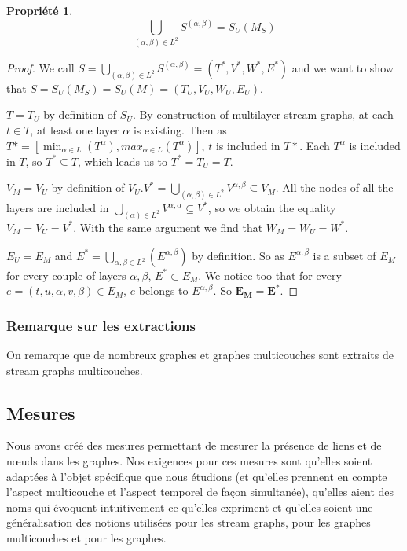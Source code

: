 \documentclass[11pt,a4paper]{article}
\newtheorem{prop}{Propriété}
\theoremstyle{definition}
\theoremstyle{remark}
\theoremstyle{remark}
\begin{document}
	\begin{prop}
		\[
			\bigcup_{(\alpha,\beta) \in L^2} S^{(\alpha,\beta)} = S_U(M_S)
		\]
	\end{prop}
	\begin{proof}
	We call $S=\bigcup_{(\alpha,\beta) \in L^2} S^{(\alpha,\beta)}=(T^{*},V^{*},W^{*},E^{*})$ and we want to show that $S=S_U(M_S)=S_U(M) = (T_U,V_U,W_U,E_U)$.
	
	$T=T_U$ by definition of $S_U$. By construction of multilayer stream graphs, at each $t\in T$, at least one layer $\alpha$ is existing. Then as $T* = [\min_{\alpha \in L} (T^{\alpha}),max_{\alpha \in L} (T^{\alpha})]$, $t$ is included in $T*$. Each $T^{\alpha}$ is included in $T$, so $T^* \subseteq T$, which leads us to $T^*=T_U=T$.
	
	$V_M = V_U$ by definition of $V_U$.$V^{*}=\bigcup_{(\alpha,\beta) \in L^2} V^{\alpha,\beta} \subseteq V_M$. All the nodes of all the layers are included in $\bigcup_{(\alpha) \in L^2} V^{\alpha,\alpha} \subseteq V^{*}$, so we obtain the equality $V_M=V_U=V^*$.
	With the same argument we find that $W_M=W_U=W^*$.
	
	$E_U=E_M$ and $E^{*}=\bigcup_{\alpha,\beta \in L^2}(E^{\alpha,\beta})$ by definition. So as $E^{\alpha,\beta}$ is a subset of $E_M$ for every couple of layers $\alpha,\beta$, $E^{*} \subset E_M$. We notice too that for every $e =(t,u,\alpha,v,\beta) \in E_M$, $e$ belongs to $E^{\alpha,\beta}$. So $\mathbf{E_M=E^{*}}$.
					
	\end{proof}

\subsubsection{Remarque sur les extractions}
On remarque que de nombreux graphes et graphes multicouches sont extraits de stream graphs multicouches.


\subsection{Mesures}


Nous avons créé des mesures permettant de mesurer la présence de liens et de nœuds dans les graphes. Nos exigences pour ces mesures sont qu'elles soient adaptées à l'objet spécifique que nous étudions (et qu'elles prennent en compte l'aspect multicouche et l'aspect temporel de façon simultanée), qu'elles aient des noms qui évoquent intuitivement ce qu'elles expriment et qu'elles soient une généralisation des notions utilisées pour les stream graphs, pour les graphes multicouches et pour les graphes.
\end{document}
